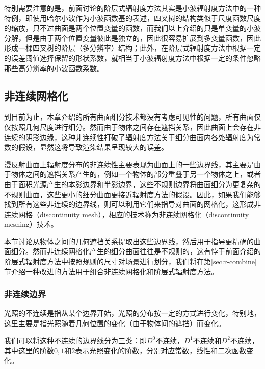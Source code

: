 特别需要注意的是，前面讨论的阶层式辐射度方法其实是小波辐射度方法中的一种特例，即使用哈尔小波作为小波函数基的表述，四叉树的结构类似于尺度函数尺度的缩放，只不过曲面是两个位置变量的函数，而我们以上介绍的只是单变量的小波分解，但是由于两个位置变量彼此是独立的，因此很容易扩展到多变量函数，因此形成一棵四叉树的阶层（多分辨率）结构；此外，在阶层式辐射度方法中根据一定的误差阈值选择保留的形状系数，就相当于小波辐射度方法中根据一定的条件忽略那些高分辨率的小波函数系数。





\subsection{非连续网格化}\label{sec:r-discontinuity-meshing}
到目前为止，本章介绍的所有曲面细分技术都没有考虑可见性的问题，所有曲面仅仅按照几何尺度进行细分。然而由于物体之间存在遮挡关系，因此曲面上会存在非连续的阴影边缘，这种非连续性打破了辐射度方法关于细分曲面内各处辐射度为常数的假设，显然这将导致渲染结果呈现较大的误差。

漫反射曲面上辐射度分布的非连续性主要表现为曲面上的一些边界线，其主要是由于物体之间的遮挡关系产生的，例如一个物体的部分重叠于另一个物体之上，或者由于面积光源产生的本影边界和半影边界，这些不规则边界将曲面细分为更复杂的不规则曲面，这些更小的细分曲面更接近辐射度方法的假设。因此，如果我们能够找到所有这些非连续的边界线，则可以利用它们来指导对曲面的网格化，这形成非连续网格（discontinuity mesh），相应的技术称为非连续网格化（discontinuity meshing）技术。

本节讨论从物体之间的几何遮挡关系提取出这些边界线，然后用于指导更精确的曲面细分。然而非连续网格化产生的细分曲面往往是不规则的，这有悖于前面介绍的阶层式辐射度方法中按照规则的尺寸对场景进行划分，我们将在第\ref{sec:r-combine}节介绍一种改进的方法用于组合非连续网格化和阶层式辐射度方法。




\subsubsection{非连续边界}
光照的不连续是指从某个边界开始，光照的分布按一定的方式进行变化，特别地，这里主要是指光照随着几何位置的变化（由于物体间的遮挡）而变化。

我们可以将这种不连续的边界线分为三类\cite{a:ADiscontinuityMeshingAlgorithmforAccurateRadiosity}：即$D^{0}$不连续，$D^{1}$不连续和$D^{2}$不连续，其中这里的阶数$0,1$和$2$表示光照变化的阶数，分别对应常数，线性和二次函数变化。

